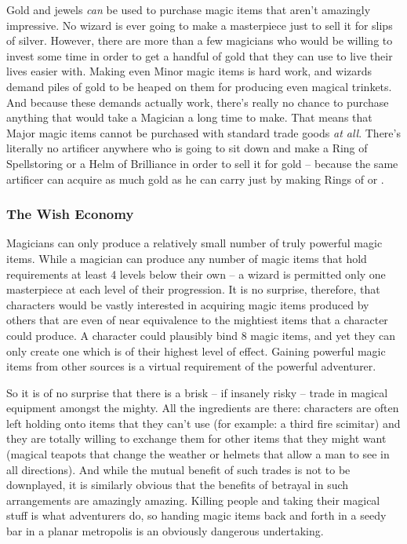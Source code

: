 Gold and jewels \textit{can} be used to purchase magic items that aren't amazingly impressive. No wizard is ever going to make a masterpiece just to sell it for slips of silver. However, there are more than a few magicians who would be willing to invest some time in order to get a handful of gold that they can use to live their lives easier with. Making even Minor magic items is hard work, and wizards demand piles of gold to be heaped on them for producing even magical trinkets. And because these demands actually work, there's really no chance to purchase anything that would take a Magician a long time to make. That means that Major magic items cannot be purchased with standard trade goods \textit{at all}. There's literally no artificer anywhere who is going to sit down and make a Ring of Spellstoring or a Helm of Brilliance in order to sell it for gold -- because the same artificer can acquire as much gold as he can carry just by making Rings of  or .

\subsubsection{The Wish Economy}
\vspace*{-8pt}

Magicians can only produce a relatively small number of truly powerful magic items. While a magician can produce any number of magic items that hold requirements at least 4 levels below their own -- a wizard is permitted only one masterpiece at each level of their progression. It is no surprise, therefore, that characters would be vastly interested in acquiring magic items produced by others that are even of near equivalence to the mightiest items that a character could produce. A character could plausibly bind 8 magic items, and yet they can only create one which is of their highest level of effect. Gaining powerful magic items from other sources is a virtual requirement of the powerful adventurer.

So it is of no surprise that there is a brisk -- if insanely risky -- trade in magical equipment amongst the mighty. All the ingredients are there: characters are often left holding onto items that they can't use (for example: a third fire scimitar) and they are totally willing to exchange them for other items that they might want (magical teapots that change the weather or helmets that allow a man to see in all directions). And while the mutual benefit of such trades is not to be downplayed, it is similarly obvious that the benefits of betrayal in such arrangements are amazingly amazing. Killing people and taking their magical stuff is what adventurers do, so handing magic items back and forth in a seedy bar in a planar metropolis is an obviously dangerous undertaking.

